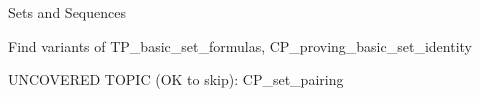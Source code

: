 \documentclass[quiz]{mcs}
\begin{document}


\begin{center}
{\large Sets and Sequences}
\end{center}

Find variants of TP\_basic\_set\_formulas,
CP\_proving\_basic\_set\_identity

UNCOVERED TOPIC (OK to skip): CP\_set\_pairing

\end{document}
